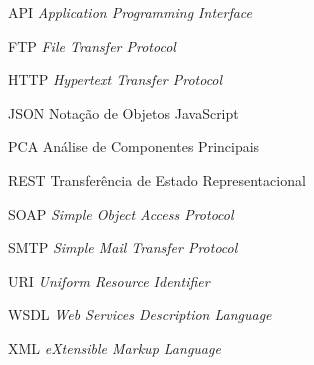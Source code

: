 \begin{siglas}
  \item[API] \textit{Application Programming Interface}
  \item[FTP] \textit{File Transfer Protocol}
  \item[HTTP] \textit{Hypertext Transfer Protocol}
  \item[JSON] Notação de Objetos JavaScript
  \item[PCA] Análise de Componentes Principais
  \item[REST] Transferência de Estado Representacional
  \item[SOAP] \textit{Simple Object Access Protocol}
  \item[SMTP] \textit{Simple Mail Transfer Protocol}
  \item[URI] \textit{Uniform Resource Identifier}
  \item[WSDL] \textit{Web Services Description Language}
  \item[XML] \textit{eXtensible Markup Language}
\end{siglas}
